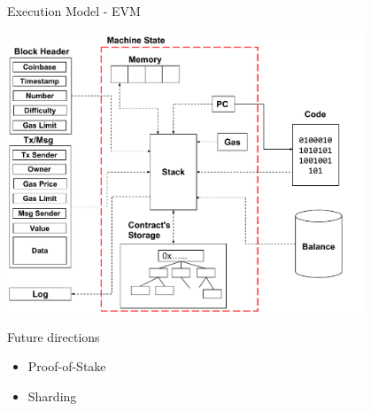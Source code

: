 \begin{frame}{Execution Model - EVM~\cite{bib:yellow}}
\begin{center}
\includegraphics[width=0.8\textwidth]{./img/evm-overview}
\end{center}
\end{frame}



\begin{frame}{Future directions}
\begin{itemize}
\item Proof-of-Stake
\item Sharding
\end{itemize}
\end{frame}
